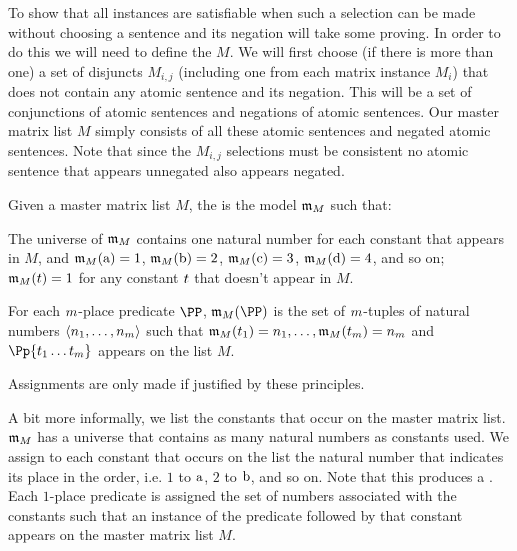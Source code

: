 To show that all instances are satisfiable when such a selection can be made without choosing a sentence and its negation will take some proving.
In order to do this we will need to define the  $M$. 
We will first choose (if there is more than one) a set of disjuncts $M_{i,j}$ (including one from each matrix instance $M_i$) that does not contain any atomic sentence and its negation.
This will be a set of conjunctions of atomic sentences and negations of atomic sentences.
Our master matrix list $M$ simply consists of all these atomic sentences and negated atomic sentences.
Note that since the $M_{i,j}$ selections must be consistent no atomic sentence that appears unnegated also appears negated.
\begin{majorILnc}{}
Given a master matrix list $M$, the  is the model $\mathfrak{m}_M$ such that:
\begin{cenumerate}
\item The universe of $\mathfrak{m}_M$ contains one natural number for each constant that appears in $M$, and $\mathfrak{m}_M(\mathrm{a})=1$, $\mathfrak{m}_M(\mathrm{b})=2$, $\mathfrak{m}_M(\mathrm{c})=3$, $\mathfrak{m}_M(\mathrm{d})=4$, and so on; $\mathfrak{m}_M(t)=1$ for any constant $t$ that doesn't appear in $M$. 
\item For each $m$-place predicate $\PP$, $\IntA_M(\PP)$ is the set of $m$-tuples of natural numbers $\langle n_1,\ldots,n_m\rangle$ such that $\mathfrak{m}_M(t_1)=n_1,\ldots,\mathfrak{m}_M(t_m)=n_m$ and $\Pp{\variable{t}_1\ldots\variable{t}_\integer{m}}$ appears on the list $M$.
\item Assignments are only made if justified by these principles.
\end{cenumerate}
\end{majorILnc}
A bit more informally, we list the constants that occur on the master matrix list. $\mathfrak{m}_M$ has a universe that contains as many natural numbers as constants used.
We assign to each constant that occurs on the list the natural number that indicates its place in the order, i.e. $1$ to $\mathrm{a}$, $2$ to $\mathrm{b}$, and so on.
Note that this produces a .
Each $1$-place predicate is assigned the set of numbers associated with the constants such that an instance of the predicate followed by that constant appears on the master matrix list $M$. 

